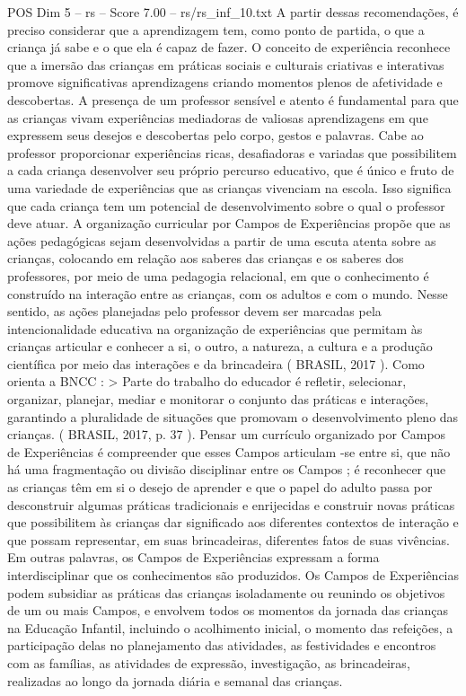 \begin{textsample}{POS Dim 5 – rs – Score 7.00 – rs/rs\_inf\_10.txt}
A partir dessas recomendações, é preciso considerar que a aprendizagem tem, como ponto de partida, o que a criança já sabe e o que ela é capaz de fazer.
O conceito de experiência reconhece que a imersão das crianças em práticas sociais e culturais criativas e interativas promove significativas aprendizagens criando momentos plenos de afetividade e descobertas.
A presença de um professor sensível e atento é fundamental para que as crianças vivam experiências mediadoras de valiosas aprendizagens em que expressem seus desejos e descobertas pelo corpo, gestos e palavras.
Cabe ao professor proporcionar experiências ricas, desafiadoras e variadas que possibilitem a cada criança desenvolver seu próprio percurso educativo, que é único e fruto de uma variedade de experiências que as crianças vivenciam na escola.
Isso significa que cada criança tem um potencial de desenvolvimento sobre o qual o professor deve atuar.
A organização curricular por Campos de Experiências propõe que as ações pedagógicas sejam desenvolvidas a partir de uma escuta atenta sobre as crianças, colocando em relação aos saberes das crianças e os saberes dos professores, por meio de uma pedagogia relacional, em que o conhecimento é construído na interação entre as crianças, com os adultos e com o mundo.
Nesse sentido, as ações planejadas pelo professor devem ser marcadas pela intencionalidade educativa na organização de experiências que permitam às crianças articular e conhecer a si, o outro, a natureza, a cultura e a produção científica por meio das interações e da brincadeira ( BRASIL, 2017 ).
Como orienta a BNCC : > Parte do trabalho do educador é refletir, selecionar, organizar, planejar, mediar e monitorar o conjunto das práticas e interações, garantindo a pluralidade de situações que promovam o desenvolvimento pleno das crianças. ( BRASIL, 2017, p. 37 ).
Pensar um currículo organizado por Campos de Experiências é compreender que esses Campos articulam -se entre si, que não há uma fragmentação ou divisão disciplinar entre os Campos ; é reconhecer que as crianças têm em si o desejo de aprender e que o papel do adulto passa por desconstruir algumas práticas tradicionais e enrijecidas e construir novas práticas que possibilitem às crianças dar significado aos diferentes contextos de interação e que possam representar, em suas brincadeiras, diferentes fatos de suas vivências.
Em outras palavras, os Campos de Experiências expressam a forma interdisciplinar que os conhecimentos são produzidos.
Os Campos de Experiências podem subsidiar as práticas das crianças isoladamente ou reunindo os objetivos de um ou mais Campos, e envolvem todos os momentos da jornada das crianças na Educação Infantil, incluindo o acolhimento inicial, o momento das refeições, a participação delas no planejamento das atividades, as festividades e encontros com as famílias, as atividades de expressão, investigação, as brincadeiras, realizadas ao longo da jornada diária e semanal das crianças.

\end{textsample}
